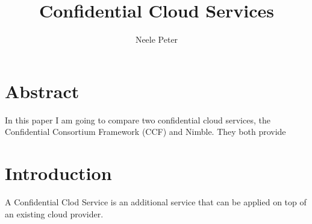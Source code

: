 \documentclass[acmtog]{acmart}
\title{Confidential Cloud Services}
\author{Neele Peter}
\begin{document}
	
	
	\maketitle

\section{Abstract}	
	In this paper I am going to compare two confidential cloud services, the Confidential Consortium Framework (CCF) and Nimble. They both provide 

\section{Introduction}
	A Confidential Clod Service is an additional service that can be applied on top of an existing cloud provider. 
\end{document}
